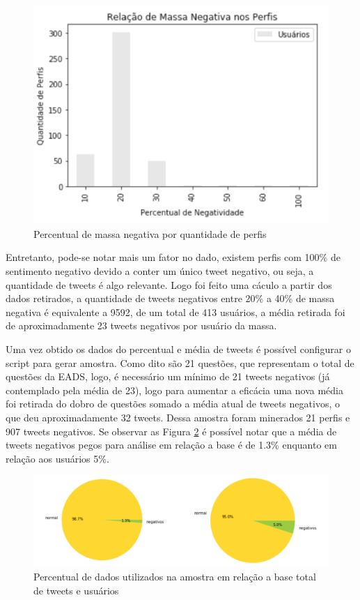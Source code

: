 \begin{figure}[!h]
    \centering
    \includegraphics[width=.4\textwidth]{imagens/relacao-massa-neg.png}
    \caption{Percentual de massa negativa por quantidade de perfis}
    \label{fig:negative-pop-relation}
\end{figure}

Entretanto, pode-se notar mais um fator no dado, existem perfis com 100\% de sentimento negativo devido a conter um único tweet negativo, ou seja, a quantidade de tweets é algo relevante. Logo foi feito uma cáculo a partir dos dados retirados, a quantidade de tweets negativos entre 20\% a 40\% de massa negativa é equivalente a 9592, de um total de 413 usuários, a média retirada foi de aproximadamente 23 tweets negativos por usuário da massa.

Uma vez obtido os dados do percentual e média de tweets é possível configurar o script para gerar amostra. Como dito são 21 questões, que representam o total de questões da EADS, logo, é necessário um mínimo de 21 tweets negativos (já contemplado pela média de 23), logo para aumentar a eficácia uma nova média foi retirada do dobro de questões somado a média atual de tweets negativos, o que deu aproximadamente 32 tweets. Dessa amostra foram minerados 21 perfis e 907 tweets negativos. Se observar as Figura \ref{fig:sample-relation} é possível notar que a média de tweets negativos pegos para análise em relação a base é de 1.3\% enquanto em relação aos usuários 5\%.

\begin{figure}[!h]
    \centering
    \includegraphics[width=.6\textwidth]{imagens/relacao-amostra.png}
    \caption{Percentual de dados utilizados na amostra em relação a base total de tweets e usuários}
    \label{fig:sample-relation}
\end{figure}

